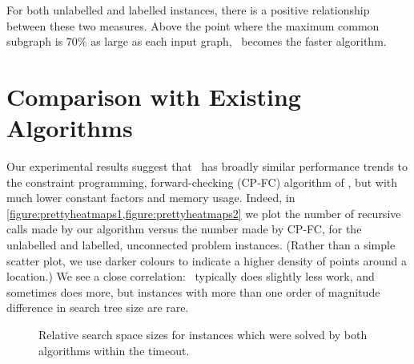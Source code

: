 For both unlabelled and labelled instances, there is a positive
relationship between these two measures. Above the point where the maximum
common subgraph is 70\% as large as each input graph, \McSplitDown\ becomes
the faster algorithm.

\FloatBarrier

\section{Comparison with Existing Algorithms}
\label{sec:comparison}

Our experimental results suggest that \McSplit\ has broadly similar performance
trends to the constraint programming, forward-checking (CP-FC) algorithm of
\citet{DBLP:conf/cp/NdiayeS11}, but with much lower constant factors and memory usage. Indeed,
in \cref{figure:prettyheatmaps1,figure:prettyheatmaps2} we plot the number of
recursive calls made by our algorithm versus the number made by
CP-FC, for the unlabelled and labelled, unconnected problem
instances. (Rather than a simple scatter plot, we use darker colours to
indicate a higher density of points around a location.) We see a close
correlation: \McSplit\ typically does slightly less work, and sometimes does more, but
instances with more than one order of magnitude difference in search tree size
are rare.

\begin{figure}[htb]
    \centering
    \caption{Relative search space sizes for instances which were solved by both algorithms within the timeout.}
    \label{figure:prettyheatmaps}
\end{figure}

